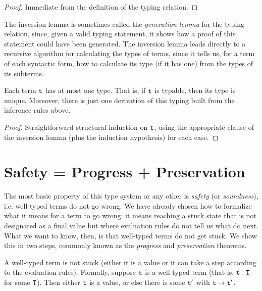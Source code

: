 \documentclass[11pt,twoside=off,numbers=noenddot]{scrbook}
\begin{document}
\begin{proof}
  Immediate from the definition of the typing relation.
\end{proof}

The inversion lemma is sometimes called the \textit{generation lemma}
for the typing relation, since, given a valid typing statement, it
shows how a proof of this statement could have been generated. The
inversion lemma leads directly to a recursive algorithm for
calculating the types of terms, since it tells us, for a term of each
syntactic form, how to calculate its type (if it has one) from the
types of its subterms.

\begin{theorem}
  Each term $\texttt{t}$ has at most one type. That is, if $\texttt{t}$ is
  typable, then its type is unique. Moreover, there is just one
  derivation of this typing built from the inference rules above.
\end{theorem}

\begin{proof}
  Straightforward structural induction on $\texttt{t}$, using the
  appropriate clause of the inversion lemma (plus the induction
  hypothesis) for each case.
\end{proof}

\section{Safety = Progress + Preservation}
The most basic property of this type system or any other is
\textit{safety} (or \textit{soundness}), i.e. well-typed terms do not
go wrong. We have already chosen how to formalize what it means for a
term to go wrong: it means reaching a stuck state that is not
designated as a final value but where evaluation rules do not tell us
what do next. What we want to know, then, is that well-typed terms do
not get stuck. We show this in two steps, commonly known as the
\textit{progress} and \textit{preservation} theorems.

\begin{theorem}[Progress]
  A well-typed term is not stuck (either it is a value or it can take
  a step according to the evaluation rules). Formally, suppose
  $\texttt{t}$ is a well-typed term (that is, $\texttt{t} : \texttt{T}$ for
  some $\texttt{T}$). Then either $\texttt{t}$ is a value, or else there is
  some $\texttt{t}'$ with $\texttt{t} \rightarrow \texttt{t}'$.
\end{theorem}
\end{document}
